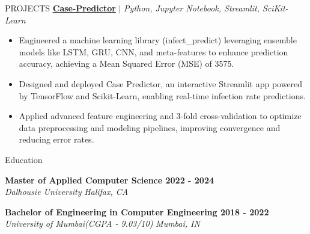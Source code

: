 \documentclass{resume} %
\begin{document}
\begin{rSection}{PROJECTS}
\href{https://github.com/RutvikJ77/Case-Predictor}{\textbf{\underline{Case-Predictor}}} $|$\textit{ Python, Jupyter Notebook, Streamlit, SciKit-Learn}
\begin{itemize}
  \item Engineered a machine learning library (infect_predict) leveraging ensemble models like LSTM, GRU, CNN, and meta-features to enhance prediction accuracy, achieving a Mean Squared Error (MSE) of 3575.
  \item Designed and deployed Case Predictor, an interactive Streamlit app powered by TensorFlow and Scikit-Learn, enabling real-time infection rate predictions.
  \item Applied advanced feature engineering and 3-fold cross-validation to optimize data preprocessing and modeling pipelines, improving convergence and reducing error rates.
\end{itemize}


\end{rSection} 


\begin{rSection}{Education}

{\bf Master of Applied Computer Science \hfill {2022 - 2024}}\\
\textit{Dalhousie University} \hfill{\textit{Halifax, CA}}

{\bf Bachelor of Engineering in Computer Engineering \hfill {2018 - 2022}}\\
\textit{University of Mumbai(CGPA - 9.03/10)} \hfill{\textit{Mumbai, IN}}


\end{rSection}
\end{document}
